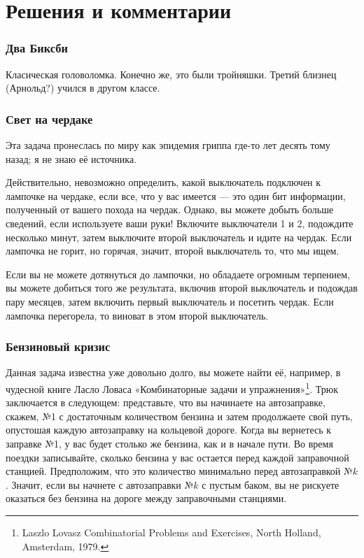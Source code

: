 \section*{Решения и комментарии}


\subsubsection*{Два Биксби} %



Класическая головоломка. 
Конечно же, это  были тройняшки. 
Третий близнец (Арнольд?) учился в другом классе.




\subsubsection*{Свет на чердаке}  %



Эта задача пронеслась по миру как эпидемия гриппа где-то лет десять тому назад; я не знаю её источника.


Действительно, невозможно определить, какой выключатель подключен к лампочке на чердаке, если все, что у вас имеется --- это один бит информации, полученный от вашего похода на чердак. Однако, вы можете добыть больше сведений, если используете ваши руки!  Включите выключатели 1 и 2, подождите несколько минут, затем выключите второй выключатель и идите на чердак. Если лампочка не горит, но горячая, значит, второй выключатель то, что мы ищем.\heart


Если вы не можете дотянуться до лампочки, но обладаете огромным терпением, вы можете добиться того же результата, включив второй выключатель и подождав пару месяцев, затем включить первый выключатель и посетить чердак. 
Если лампочка перегорела, то виноват в этом второй выключатель.


\subsubsection*{Бензиновый кризис} %

Данная задача известна уже довольно долго, вы можете найти её, например, в чудесной книге   Ласло Ловаса  «Комбинаторные задачи и упражнения»\footnote{Laszlo Lovasz Combinatorial Problems and Exercises, North Holland, Amsterdam, 1979.}. Трюк заключается в следующем:
представьте, что вы начинаете на автозаправке, скажем, №1 с достаточным количеством бензина и затем продолжаете свой путь, опустошая каждую автозаправку на кольцевой дороге. 
Когда вы вернетесь к заправке №1, 
у вас будет столько же бензина, как и в начале пути.
Во время поездки записывайте, сколько бензина у вас остается перед каждой заправочной станцией. 
Предположим, что это количество минимально перед автозаправкой №$k$. 
Значит, если вы начнете с автозаправки №$k$ с пустым баком, вы не рискуете оказаться без бензина на дороге между заправочными станциями.\heart


